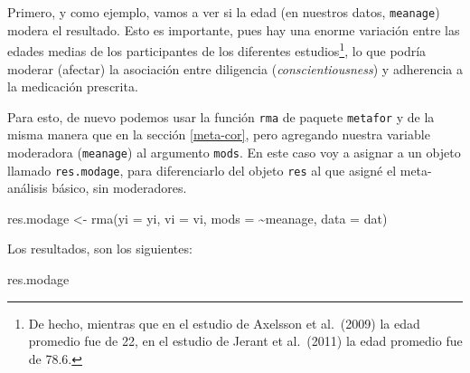 \documentclass[
  bookmarksnumbered]{article}
\newenvironment{Shaded}{\begin{snugshade}}{\end{snugshade}}
\newcommand{\AttributeTok}[1]{\textcolor[rgb]{0.00,0.34,0.68}{#1}}
\newcommand{\FunctionTok}[1]{\textcolor[rgb]{0.39,0.29,0.61}{#1}}
\newcommand{\NormalTok}[1]{\textcolor[rgb]{0.12,0.11,0.11}{#1}}
\newcommand{\OtherTok}[1]{\textcolor[rgb]{0.00,0.43,0.16}{#1}}
\newcommand{\SpecialCharTok}[1]{\textcolor[rgb]{0.24,0.68,0.91}{#1}}
\begin{document}
Primero, y como ejemplo, vamos a ver si la edad (en nuestros datos, \texttt{meanage}) modera el resultado. Esto es importante, pues hay una enorme variación entre las edades medias de los participantes de los diferentes estudios\footnote{De hecho, mientras que en el estudio de Axelsson et al.~(2009) la edad promedio fue de 22, en el estudio de Jerant et al.~(2011) la edad promedio fue de 78.6.}, lo que podría moderar (afectar) la asociación entre diligencia (\emph{conscientiousness}) y adherencia a la medicación prescrita.

Para esto, de nuevo podemos usar la función \texttt{rma} de paquete \texttt{metafor} y de la misma manera que en la sección \ref{meta-cor}, pero agregando nuestra variable moderadora (\texttt{meanage}) al argumento \texttt{mods}. En este caso voy a asignar a un objeto llamado \texttt{res.modage}, para diferenciarlo del objeto \texttt{res} al que asigné el meta-análisis básico, sin moderadores.

\begin{Shaded}
\begin{Highlighting}[]
\NormalTok{res.modage }\OtherTok{\textless{}{-}} \FunctionTok{rma}\NormalTok{(}\AttributeTok{yi =}\NormalTok{ yi, }\AttributeTok{vi =}\NormalTok{ vi, }\AttributeTok{mods =} \SpecialCharTok{\textasciitilde{}}\NormalTok{meanage, }\AttributeTok{data =}\NormalTok{ dat)}
\end{Highlighting}
\end{Shaded}

Los resultados, son los siguientes:

\begin{Shaded}
\begin{Highlighting}[]
\NormalTok{res.modage}
\end{Highlighting}
\end{Shaded}
\end{document}
